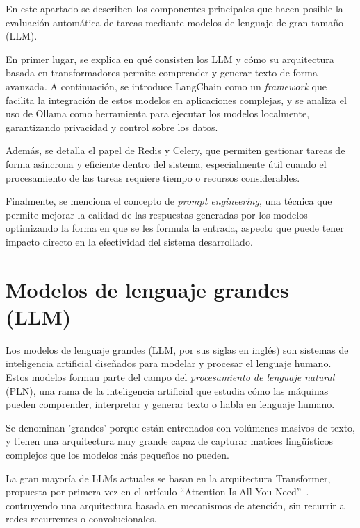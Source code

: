 
En este apartado se describen los componentes principales que hacen posible la evaluación 
automática de tareas mediante modelos de lenguaje de gran tamaño (LLM). 

En primer lugar, se explica en qué consisten los LLM y cómo su arquitectura basada en 
transformadores permite comprender y generar texto de forma avanzada. A continuación, 
se introduce LangChain como un \textit{framework} que facilita la integración de estos 
modelos en aplicaciones complejas, y se analiza el uso de Ollama como herramienta para 
ejecutar los modelos localmente, garantizando privacidad y control sobre los datos.

Además, se detalla el papel de Redis y Celery, que permiten gestionar tareas de forma 
asíncrona y eficiente dentro del sistema, especialmente útil cuando el procesamiento de 
las tareas requiere tiempo o recursos considerables.

Finalmente, se menciona el concepto de \textit{prompt engineering}, una técnica que permite 
mejorar la calidad de las respuestas generadas por los modelos optimizando la forma en que 
se les formula la entrada, aspecto que puede tener impacto directo en la efectividad del 
sistema desarrollado.

\section{Modelos de lenguaje grandes (LLM)}

Los modelos de lenguaje grandes (LLM, por sus siglas en inglés) son sistemas de 
inteligencia artificial diseñados para modelar y procesar el lenguaje humano. 
Estos modelos forman parte del campo del \textit{procesamiento de lenguaje natural} (PLN), 
una rama de la inteligencia artificial que estudia cómo las máquinas pueden comprender, 
interpretar y generar texto o habla en lenguaje humano.

Se denominan 'grandes' porque están entrenados con volúmenes 
masivos de texto, y tienen una arquitectura muy grande capaz de capturar matices 
lingüísticos complejos que los modelos más pequeños no pueden.

La gran mayoría de LLMs actuales se basan en la arquitectura Transformer, propuesta por 
primera vez en el artículo ``Attention Is All You Need''~\cite{vaswani2017}. 
contruyendo una arquitectura basada en mecanismos de atención, sin recurrir a 
redes recurrentes o convolucionales.


